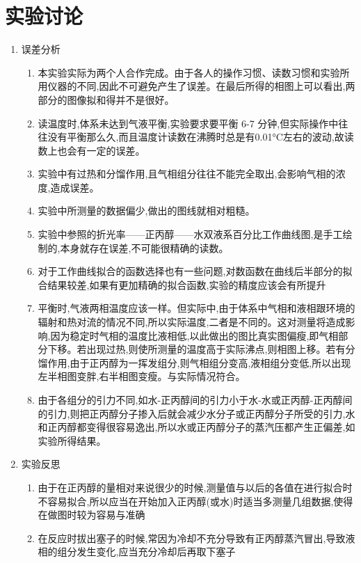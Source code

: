 \documentclass[11pt]{report}
\begin{document}
\section{实验讨论}
\label{sec:org5f8687f}
\begin{enumerate}
\item 误差分析
\label{sec:org51d3dd1}
\begin{enumerate}
\item 本实验实际为两个人合作完成。由于各人的操作习惯、读数习惯和实验所用仪器的不同,因此不可避免产生了误差。在最后所得的相图上可以看出,两部分的图像拟和得并不是很好。
\item 读温度时,体系未达到气液平衡,实验要求要平衡 6-7 分钟,但实际操作中往往没有平衡那么久,而且温度计读数在沸腾时总是有0.01°C左右的波动,故读数上也会有一定的误差。
\item 实验中有过热和分馏作用,且气相组分往往不能完全取出,会影响气相的浓度,造成误差。
\item 实验中所测量的数据偏少,做出的图线就相对粗糙。
\item 实验中参照的折光率——正丙醇——水双液系百分比工作曲线图,是手工绘制的,本身就存在误差,不可能很精确的读数。
\item 对于工作曲线拟合的函数选择也有一些问题,对数函数在曲线后半部分的拟合结果较差,如果有更加精确的拟合函数,实验的精度应该会有所提升
\item 平衡时,气液两相温度应该一样。但实际中,由于体系中气相和液相跟环境的辐射和热对流的情况不同,所以实际温度,二者是不同的。这对测量将造成影响,因为稳定时气相的温度比液相低,以此做出的图比真实图偏瘦,即气相部分下移。若出现过热,则使所测量的温度高于实际沸点,则相图上移。若有分馏作用,由于正丙醇为一挥发组分,则气相组分变高,液相组分变低,所以出现左半相图变胖,右半相图变瘦。与实际情况符合。
\item 由于各组分的引力不同,如水-正丙醇间的引力小于水-水或正丙醇-正丙醇间的引力,则把正丙醇分子掺入后就会减少水分子或正丙醇分子所受的引力,水和正丙醇都变得很容易逸出,所以水或正丙醇分子的蒸汽压都产生正偏差,如实验所得结果。
\end{enumerate}
\item 实验反思
\label{sec:org5ce5199}
\begin{enumerate}
\item 由于在正丙醇的量相对来说很少的时候,测量值与以后的各值在进行拟合时不容易拟合,所以应当在开始加入正丙醇(或水)时适当多测量几组数据,使得在做图时较为容易与准确
\item 在反应时拔出塞子的时候,常因为冷却不充分导致有正丙醇蒸汽冒出,导致液相的组分发生变化,应当充分冷却后再取下塞子
\end{enumerate}
\end{enumerate}
\end{document}
